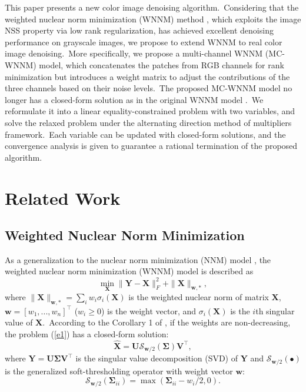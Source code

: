 This paper presents a new color image denoising algorithm.\ Considering that the weighted nuclear norm minimization (WNNM) method \cite{wnnm,wnnmijcv}, which exploits the image NSS property via low rank regularization, has achieved excellent denoising performance on grayscale images, we propose to extend WNNM to real color image denoising.\ More specifically, we propose a multi-channel WNNM (MC-WNNM) model, which concatenates the patches from RGB channels for rank minimization but introduces a weight matrix to adjust the contributions of the three channels based on their noise levels.\ The proposed MC-WNNM model no longer has a closed-form solution as in the original WNNM model \cite{wnnmijcv}.\ We reformulate it into a linear equality-constrained problem with two variables, and solve the relaxed problem under the alternating direction method of multipliers \cite{admm} framework.\ Each variable can be updated with closed-form solutions, and the convergence analysis is given to guarantee a rational termination of the proposed algorithm.

\section{Related Work}

\subsection{Weighted Nuclear Norm Minimization}

As a generalization to the nuclear norm minimization (NNM) model \cite{cai2010singular}, the weighted nuclear norm minimization (WNNM) model \cite{wnnm,wnnmijcv} is described as 
\begin{equation}
\label{e1}
\min_{\mathbf{X}}\|\mathbf{Y}-\mathbf{X}\|_{F}^{2}
+
\|\mathbf{X}\|_{\bm{w},*},
\end{equation}
where $\|\mathbf{X}\|_{\bm{w},*}=\sum_{i}w_{i}\sigma_{i}(\mathbf{X})$ is the weighted nuclear norm of matrix $\mathbf{X}$, $\bm{w}=[w_{1},...,w_{n}]^{\top}$ ($w_{i}\ge 0$) is the weight vector, and $\sigma_{i}(\mathbf{X})$ is the $i$th singular value of $\mathbf{X}$.\ According to the Corollary 1 of \cite{wnnmijcv}, if the weights are non-decreasing, the problem (\ref{e1}) has a closed-form solution: 
\begin{equation}
\label{e2}
\mathbf{\hat{X}}
=
\mathbf{U}
\mathcal{S}_{\bm{w}/2}
(\mathbf{\Sigma})
\mathbf{V}^{\top},
\end{equation}
where $\mathbf{Y}=\mathbf{U}\mathbf{\Sigma}\mathbf{V}^{\top}$ is the singular value decomposition (SVD) \cite{eckart1936approximation} of $\mathbf{Y}$ and 
$\mathcal{S}_{\bm{w}/2}(\bullet)$ is the generalized soft-thresholding operator with weight vector $\bm{w}$:
\begin{equation}
\label{e3}
\mathcal{S}_{\bm{w}/2}
(\mathbf{\Sigma}_{ii})
=
\max(\mathbf{\Sigma}_{ii}-w_{i}/2, 0).
\end{equation}

